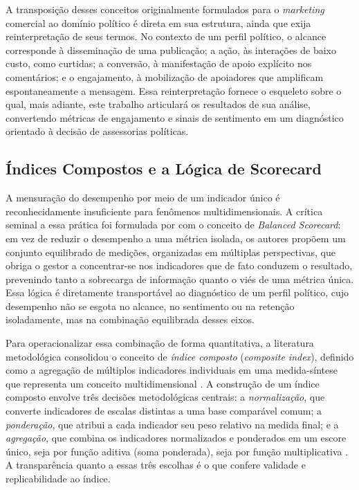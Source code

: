A transposição desses conceitos \textemdash{} originalmente formulados para o \emph{marketing} comercial \textemdash{} ao domínio político é direta em sua estrutura, ainda que exija reinterpretação de seus termos. No contexto de um perfil político, o alcance corresponde à disseminação de uma publicação; a ação, às interações de baixo custo, como curtidas; a conversão, à manifestação de apoio explícito nos comentários; e o engajamento, à mobilização de apoiadores que amplificam espontaneamente a mensagem. Essa reinterpretação fornece o esqueleto sobre o qual, mais adiante, este trabalho articulará os resultados de sua análise, convertendo métricas de engajamento e sinais de sentimento em um diagnóstico orientado à decisão de assessorias políticas.

\subsection{Índices Compostos e a Lógica de Scorecard}

A mensuração do desempenho por meio de um indicador único é reconhecidamente insuficiente para fenômenos multidimensionais. A crítica seminal a essa prática foi formulada por  com o conceito de \textit{Balanced Scorecard}: em vez de reduzir o desempenho a uma métrica isolada, os autores propõem um conjunto equilibrado de medições, organizadas em múltiplas perspectivas, que obriga o gestor a concentrar-se nos indicadores que de fato conduzem o resultado, prevenindo tanto a sobrecarga de informação quanto o viés de uma métrica única. Essa lógica é diretamente transportável ao diagnóstico de um perfil político, cujo desempenho não se esgota no alcance, no sentimento ou na retenção isoladamente, mas na combinação equilibrada desses eixos.

Para operacionalizar essa combinação de forma quantitativa, a literatura metodológica consolidou o conceito de \textit{índice composto} (\textit{composite index}), definido como a agregação de múltiplos indicadores individuais em uma medida-síntese que representa um conceito multidimensional \cite{nardo2008}. A construção de um índice composto envolve três decisões metodológicas centrais: a \textit{normalização}, que converte indicadores de escalas distintas a uma base comparável comum; a \textit{ponderação}, que atribui a cada indicador seu peso relativo na medida final; e a \textit{agregação}, que combina os indicadores normalizados e ponderados em um escore único, seja por função aditiva (soma ponderada), seja por função multiplicativa \cite{nardo2008}. A transparência quanto a essas três escolhas é o que confere validade e replicabilidade ao índice.


